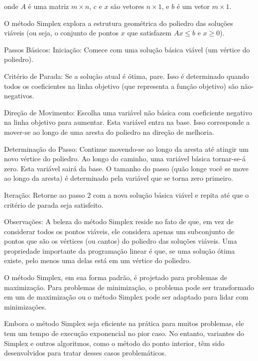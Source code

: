 \documentclass[]{article}
\theoremstyle{definition}
\theoremstyle{definition}
\begin{document}
onde \( A \) é uma matriz \( m \times n \), \( c \) e \( x \) são vetores \( n \times 1 \), e \( b \) é um vetor \( m \times 1 \).


O método Simplex explora a estrutura geométrica do poliedro das soluções viáveis (ou seja, o conjunto de pontos $x$ que satisfazem $Ax \leq b$ e $x \geq 0$).

Passos Básicos:
Iniciação: Comece com uma solução básica viável (um vértice do poliedro).

Critério de Parada: Se a solução atual é ótima, pare. Isso é determinado quando todos os coeficientes na linha objetivo (que representa a função objetivo) são não-negativos.

Direção de Movimento: Escolha uma variável não básica com coeficiente negativo na linha objetivo para aumentar. Esta variável entra na base. Isso corresponde a mover-se ao longo de uma aresta do poliedro na direção de melhoria.

Determinação do Passo: Continue movendo-se ao longo da aresta até atingir um novo vértice do poliedro. Ao longo do caminho, uma variável básica tornar-se-á zero. Esta variável sairá da base. O tamanho do passo (quão longe você se move ao longo da aresta) é determinado pela variável que se torna zero primeiro.

Iteração: Retorne ao passo 2 com a nova solução básica viável e repita até que o critério de parada seja satisfeito.

Observações:
A beleza do método Simplex reside no fato de que, em vez de considerar todos os pontos viáveis, ele considera apenas um subconjunto de pontos que são os vértices (ou cantos) do poliedro das soluções viáveis. Uma propriedade importante da programação linear é que, se uma solução ótima existe, pelo menos uma delas está em um vértice do poliedro.

O método Simplex, em sua forma padrão, é projetado para problemas de maximização. Para problemas de minimização, o problema pode ser transformado em um de maximização ou o método Simplex pode ser adaptado para lidar com minimizações.

Embora o método Simplex seja eficiente na prática para muitos problemas, ele tem um tempo de execução exponencial no pior caso. No entanto, variantes do Simplex e outros algoritmos, como o método do ponto interior, têm sido desenvolvidos para tratar desses casos problemáticos.
\end{document}
